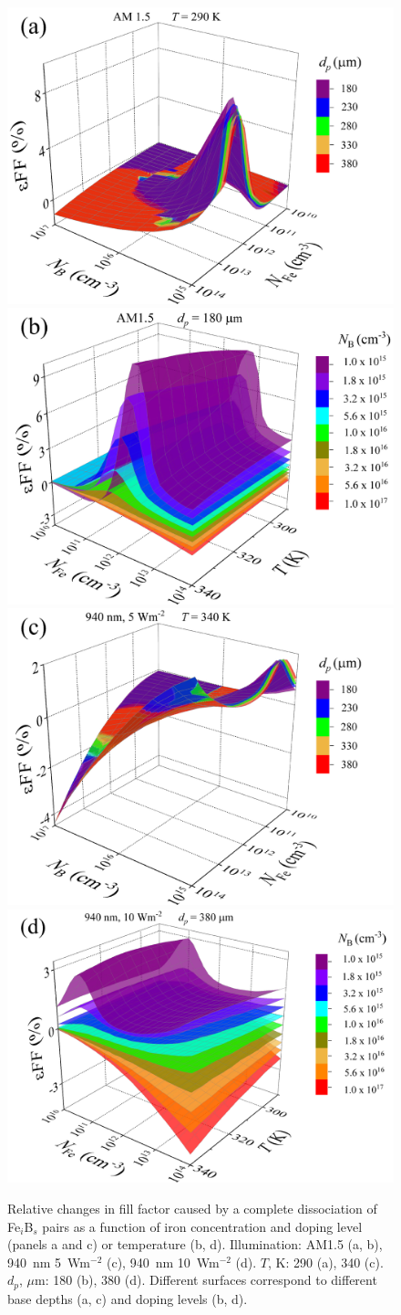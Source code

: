 \documentclass[a4paper,fleqn]{cas-sc}
\begin{document}
\begin{figure}
	\centering
     \includegraphics[width=0.49\linewidth]{Fig8a.png}
     \includegraphics[width=0.49\linewidth]{Fig8b.png}
     \includegraphics[width=0.49\linewidth]{Fig8c.png}
     \includegraphics[width=0.49\linewidth]{Fig8d.png}
	  \caption{Relative changes in fill factor caused by a complete
       dissociation of Fe$_i$B$_s$ pairs as a function of
       iron concentration and
       doping level (panels a and c) or temperature (b, d).
       Illumination: AM1.5 (a, b), 940~nm 5~Wm$^{-2}$ (c),  940~nm 10~Wm$^{-2}$ (d).
       $T$, K: 290 (a), 340 (c).
       $d_p$, $\mu$m: 180 (b), 380 (d).
       Different surfaces correspond to different base depths (a, c) and doping levels (b, d).
}\label{fig8}
\end{figure}
\end{document}
